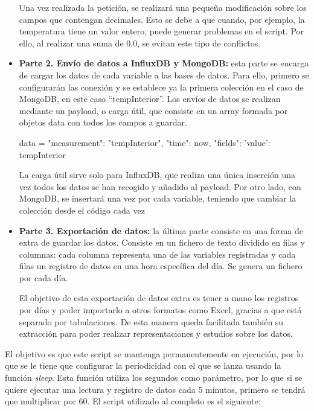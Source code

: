 \begin{itemize}
    Una vez realizada la petición, se realizará una pequeña modificación sobre los campos que contengan decimales. Esto se debe a que cuando, por ejemplo, la temperatura tiene un valor entero, puede generar problemas en el script. Por ello, al realizar una suma de 0.0, se evitan este tipo de conflictos.

    \item \textbf{Parte 2. Envío de datos a InfluxDB y MongoDB:} esta parte se encarga de cargar los datos de cada variable a las bases de datos. Para ello, primero se configurarán las conexión y se establece ya la primera colección en el caso de MongoDB, en este caso “tempInterior”. Los envíos de datos se realizan mediante un payload, o carga útil, que consiste en un array formada por objetos data con todos los campos a guardar.

    \begin{python}
    data = {
        "measurement": "tempInterior",
        "time": now,
        "fields": {
            'value': tempInterior
        }
    }
    \end{python}

    La carga útil sirve solo para InfluxDB, que realiza una única inserción una vez todos los datos se han recogido y añadido al payload. Por otro lado, con MongoDB, se insertará una vez por cada variable, teniendo que cambiar la colección desde el código cada vez

    \item \textbf{Parte 3. Exportación de datos:} la última parte consiste en una forma de extra de guardar los datos. Consiste en un fichero de texto dividido en filas y columnas: cada columna representa una de las variables registradas y cada filas un registro de datos en una hora específica del día. Se genera un fichero por cada día.

    El objetivo de esta exportación de datos extra es tener a mano los registros por días y poder importarlo a otros formatos como Excel, gracias a que está separado por tabulaciones. De esta manera queda facilitada también su extracción para poder realizar representaciones y estudios sobre los datos.
\end{itemize}

El objetivo es que este script se mantenga permanentemente en ejecución, por lo que se le tiene que configurar la periodicidad con el que se lanza usando la función \textit{sleep}. Esta función utiliza los segundos como parámetro, por lo que si se quiere ejecutar una lectura y registro de datos cada 5 minutos, primero se tendrá que multiplicar por 60. El script utilizado al completo es el siguiente:

